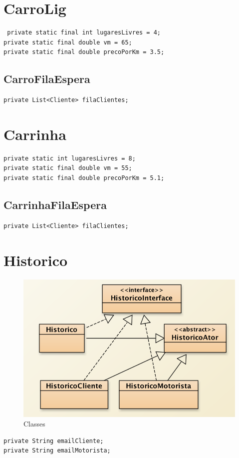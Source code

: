 \section{CarroLig}

\begin{verbatim}
 private static final int lugaresLivres = 4;
private static final double vm = 65; 
private static final double precoPorKm = 3.5;
\end{verbatim}

\subsection{CarroFilaEspera}
\begin{verbatim}
private List<Cliente> filaClientes;
\end{verbatim}

\section{Carrinha}

\begin{verbatim}
private static int lugaresLivres = 8;
private static final double vm = 55;
private static final double precoPorKm = 5.1;
\end{verbatim}

\subsection{CarrinhaFilaEspera}
\begin{verbatim}
private List<Cliente> filaClientes;
\end{verbatim}

\newpage
\section{Historico}
\begin{figure}[htpb]
	\centering
	\includegraphics[scale=0.6]{imagem/historico}
	\caption{Classes }
	\label{p2:fig:p2_historico}
\end{figure}
\begin{verbatim}
private String emailCliente; 
private String emailMotorista; 
\end{verbatim}

